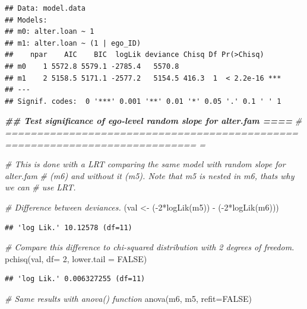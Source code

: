 \documentclass[
]{book}
\newenvironment{Shaded}{\begin{snugshade}}{\end{snugshade}}
\newcommand{\AttributeTok}[1]{\textcolor[rgb]{0.77,0.63,0.00}{#1}}
\newcommand{\CommentTok}[1]{\textcolor[rgb]{0.56,0.35,0.01}{\textit{#1}}}
\newcommand{\ConstantTok}[1]{\textcolor[rgb]{0.00,0.00,0.00}{#1}}
\newcommand{\DecValTok}[1]{\textcolor[rgb]{0.00,0.00,0.81}{#1}}
\newcommand{\DocumentationTok}[1]{\textcolor[rgb]{0.56,0.35,0.01}{\textbf{\textit{#1}}}}
\newcommand{\FunctionTok}[1]{\textcolor[rgb]{0.00,0.00,0.00}{#1}}
\newcommand{\NormalTok}[1]{#1}
\newcommand{\OtherTok}[1]{\textcolor[rgb]{0.56,0.35,0.01}{#1}}
\newcommand{\SpecialCharTok}[1]{\textcolor[rgb]{0.00,0.00,0.00}{#1}}
\begin{document}
\begin{verbatim}
## Data: model.data
## Models:
## m0: alter.loan ~ 1
## m1: alter.loan ~ (1 | ego_ID)
##    npar    AIC    BIC  logLik deviance Chisq Df Pr(>Chisq)    
## m0    1 5572.8 5579.1 -2785.4   5570.8                        
## m1    2 5158.5 5171.1 -2577.2   5154.5 416.3  1  < 2.2e-16 ***
## ---
## Signif. codes:  0 '***' 0.001 '**' 0.01 '*' 0.05 '.' 0.1 ' ' 1
\end{verbatim}

\begin{Shaded}
\begin{Highlighting}[]
\DocumentationTok{\#\# Test significance of ego{-}level random slope for alter.fam                ====}
\CommentTok{\# ============================================================================ =}

\CommentTok{\# This is done with a LRT comparing the same model with random slope for alter.fam}
\CommentTok{\# (m6) and without it (m5). Note that m5 is nested in m6, that\textquotesingle{}s why we can }
\CommentTok{\# use LRT.}

\CommentTok{\# Difference between deviances.}
\NormalTok{(val }\OtherTok{\textless{}{-}}\NormalTok{ (}\SpecialCharTok{{-}}\DecValTok{2}\SpecialCharTok{*}\FunctionTok{logLik}\NormalTok{(m5)) }\SpecialCharTok{{-}}\NormalTok{ (}\SpecialCharTok{{-}}\DecValTok{2}\SpecialCharTok{*}\FunctionTok{logLik}\NormalTok{(m6)))}
\end{Highlighting}
\end{Shaded}

\begin{verbatim}
## 'log Lik.' 10.12578 (df=11)
\end{verbatim}

\begin{Shaded}
\begin{Highlighting}[]
\CommentTok{\# Compare this difference to chi{-}squared distribution with 2 degrees of freedom.}
\FunctionTok{pchisq}\NormalTok{(val, }\AttributeTok{df=} \DecValTok{2}\NormalTok{, }\AttributeTok{lower.tail =} \ConstantTok{FALSE}\NormalTok{)}
\end{Highlighting}
\end{Shaded}

\begin{verbatim}
## 'log Lik.' 0.006327255 (df=11)
\end{verbatim}

\begin{Shaded}
\begin{Highlighting}[]
\CommentTok{\# Same results with anova() function}
\FunctionTok{anova}\NormalTok{(m6, m5, }\AttributeTok{refit=}\ConstantTok{FALSE}\NormalTok{)}
\end{Highlighting}
\end{Shaded}
\end{document}
